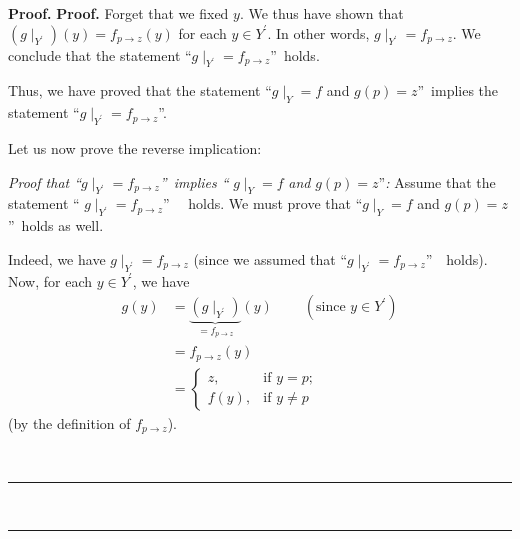 \documentclass[numbers=enddot,12pt,final,onecolumn,notitlepage]{scrartcl}%
\numberwithin{exer}{section}
\theoremstyle{definition}
\newenvironment{proof}[1][Proof]{\noindent\textbf{#1.} }{\ \rule{0.5em}{0.5em}}
\newenvironment{verlong}{}{}
\begin{document}
\begin{verlong}
\begin{proof}
\begin{proof}
Forget that we fixed $y$. We thus have shown that $\left(  g\mid_{Y^{\prime}%
}\right)  \left(  y\right)  =f_{p\rightarrow z}\left(  y\right)  $ for each
$y\in Y^{\prime}$. In other words, $\left.  g\mid_{Y^{\prime}}\right.
=f_{p\rightarrow z}$. We conclude that the statement \textquotedblleft$\left.
g\mid_{Y^{\prime}}\right.  =f_{p\rightarrow z}$\textquotedblright\ holds.

Thus, we have proved that the statement \textquotedblleft$\left.  g\mid
_{Y}\right.  =f$ and $g\left(  p\right)  =z$\textquotedblright\ implies the
statement \textquotedblleft$\left.  g\mid_{Y^{\prime}}\right.
=f_{p\rightarrow z}$\textquotedblright.

Let us now prove the reverse implication:

\textit{Proof that \textquotedblleft}$\left.  g\mid_{Y^{\prime}}\right.
=f_{p\rightarrow z}$\textit{\textquotedblright\ implies \textquotedblleft%
}$\left.  g\mid_{Y}\right.  =f$\textit{ and }$g\left(  p\right)
=z$\textquotedblright\textit{:} Assume that the statement \textquotedblleft%
$\left.  g\mid_{Y^{\prime}}\right.  =f_{p\rightarrow z}$\textquotedblright%
\ \ holds. We must prove that \textquotedblleft$\left.  g\mid_{Y}\right.  =f$
and $g\left(  p\right)  =z$\textquotedblright\ holds as well.

Indeed, we have $\left.  g\mid_{Y^{\prime}}\right.  =f_{p\rightarrow z}$
(since we assumed that \textquotedblleft$\left.  g\mid_{Y^{\prime}}\right.
=f_{p\rightarrow z}$\textquotedblright\ \ holds). Now, for each $y\in
Y^{\prime}$, we have%
\begin{align}
g\left(  y\right)   &  =\underbrace{\left(  g\mid_{Y^{\prime}}\right)
}_{=f_{p\rightarrow z}}\left(  y\right)  \ \ \ \ \ \ \ \ \ \ \left(
\text{since }y\in Y^{\prime}\right) \nonumber\\
&  =f_{p\rightarrow z}\left(  y\right) \nonumber\\
&  =%
\begin{cases}
z, & \text{if }y=p;\\
f\left(  y\right)  , & \text{if }y\neq p
\end{cases}
\label{pf.prop.count.inj-maps.extend.c4.pf.4}%
\end{align}
(by the definition of $f_{p\rightarrow z}$).


\end{proof}
\end{proof}
\end{verlong}
\end{document}
